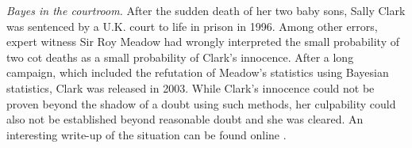 \begin{Example} \textit{Bayes in the courtroom.} After the sudden death of her two baby sons, Sally Clark was sentenced by a U.K. court to life in prison in 1996. Among other errors, expert witness Sir Roy Meadow had wrongly interpreted the small probability of two cot deaths as a small probability of Clark's innocence. After a long campaign, which included the refutation of Meadow's statistics using Bayesian statistics, Clark was released in 2003. While Clark's innocence could not be proven beyond the shadow of a doubt using such methods, her culpability could also not be established beyond reasonable doubt and she was cleared. An interesting write-up of the situation can be found online \cite{BDA_NNN}.
\end{Example}

